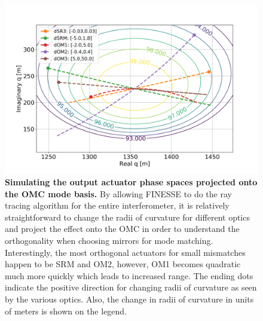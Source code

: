 	\begin{figure}[h]
		\centering
		\includegraphics[width=1.0 \textwidth]{../Figures/OutputAct_Gouyphase.png}
		\caption[Simulating the output actuator phase spaces projected onto the OMC mode basis.]
		{\textbf{Simulating the output actuator phase spaces projected onto the OMC mode basis.} 
			By allowing FINESSE to do the ray tracing algorithm for the entire interferometer, it is relatively straightforward to change the radii of curvature for different optics and project the effect onto the OMC in order to understand the orthogonality when choosing mirrors for mode matching.  Interestingly, the most orthogonal actuators for small mismatches happen to be SRM and OM2, however, OM1 becomes quadratic much more quickly which leads to increased range.  The ending dots indicate the positive direction for changing radii of curvature as seen by the various optics.  Also, the change in radii of curvature in units of meters is shown on the legend.
		}
		\label{fig:act_phase_space}
	\end{figure}

